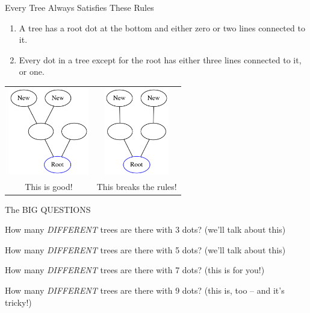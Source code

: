 \documentclass{beamer}
\begin{document}
\begin{frame}
\begin{center}
\Large Every Tree Always Satisfies These Rules
\end{center}
\begin{enumerate}
\item  A tree has a root dot at the bottom and either zero or two lines connected to it. 
\item Every dot in a tree except for the root has either three lines connected to it, or one.
\end{enumerate}
\begin{center}
\begin{tabular}{cc}
    \includegraphics[height=1.5in]{G2.png} &  \includegraphics[height=1.5in]{G4.png} \\
    This is good! & This  breaks the rules!
\end{tabular}
 \end{center}
\end{frame}
\begin{frame}
    \begin{center}
    {\Large The BIG QUESTIONS}
    
    \bigskip\noindent
    {\Large How many \textit{DIFFERENT} trees are there with 3 dots?}
        (we'll talk about this)

    \bigskip\noindent
    {\Large How many \textit{DIFFERENT} trees are there with 5 dots?}
        (we'll talk about this)

    \bigskip\noindent
    {\Large How many \textit{DIFFERENT} trees are there with 7 dots?}
        (this is for you!)

    \bigskip\noindent
    {\Large How many \textit{DIFFERENT} trees are there with 9 dots?}
        (this is, too -- and it's tricky!)
    \end{center}

\end{frame}
\end{document}

